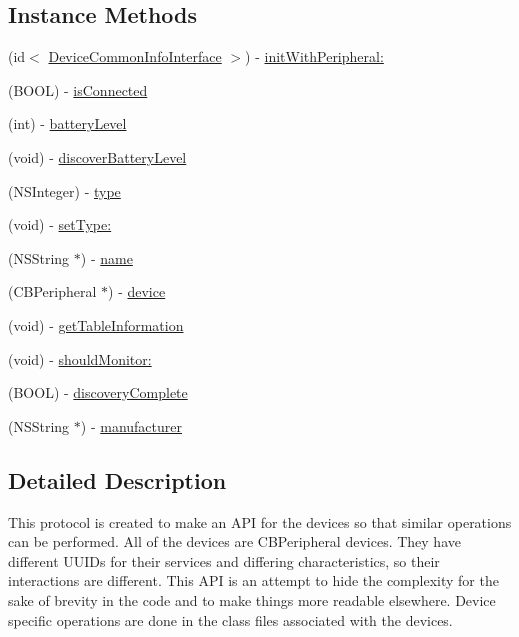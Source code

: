 \subsection*{Instance Methods}
\begin{DoxyCompactItemize}
\item 
(id$<$ \hyperlink{protocol_device_common_info_interface-p}{Device\-Common\-Info\-Interface} $>$) -\/ \hyperlink{protocol_device_common_info_interface-p_ac0680a5ceb7f913c49598eeda2dad07c}{init\-With\-Peripheral\-:}
\item 
(B\-O\-O\-L) -\/ \hyperlink{protocol_device_common_info_interface-p_a5a149dfb93c5c7a364460d8df26537b2}{is\-Connected}
\item 
(int) -\/ \hyperlink{protocol_device_common_info_interface-p_a54b8e239d2d0470be0d906b11b7f3850}{battery\-Level}
\item 
(void) -\/ \hyperlink{protocol_device_common_info_interface-p_a3e95f2da7a5916c8bb6d9b6b76fac3e7}{discover\-Battery\-Level}
\item 
(N\-S\-Integer) -\/ \hyperlink{protocol_device_common_info_interface-p_a2817a747a1ab2cf6f199b1cebe86bd83}{type}
\item 
(void) -\/ \hyperlink{protocol_device_common_info_interface-p_a1fa243ee7ba284b691c365bae4f9b463}{set\-Type\-:}
\item 
(N\-S\-String $\ast$) -\/ \hyperlink{protocol_device_common_info_interface-p_a4ae9cbc86f48df7167b691e91984f266}{name}
\item 
(C\-B\-Peripheral $\ast$) -\/ \hyperlink{protocol_device_common_info_interface-p_a60acee2f42fa42a04ba3585e08d75f8e}{device}
\item 
(void) -\/ \hyperlink{protocol_device_common_info_interface-p_a64200062c5687034c8e2ef6dd83bba0f}{get\-Table\-Information}
\item 
(void) -\/ \hyperlink{protocol_device_common_info_interface-p_a9d3d278049f74d785a57ed2aecf22e22}{should\-Monitor\-:}
\item 
(B\-O\-O\-L) -\/ \hyperlink{protocol_device_common_info_interface-p_a83c3e03ff34cc8b954743a76d77facea}{discovery\-Complete}
\item 
(N\-S\-String $\ast$) -\/ \hyperlink{protocol_device_common_info_interface-p_a4fa63c9f7fe49ddaa32bd40159bc7a8c}{manufacturer}
\end{DoxyCompactItemize}


\subsection{Detailed Description}
This protocol is created to make an A\-P\-I for the devices so that similar operations can be performed. All of the devices are C\-B\-Peripheral devices. They have different U\-U\-I\-Ds for their services and differing characteristics, so their interactions are different. This A\-P\-I is an attempt to hide the complexity for the sake of brevity in the code and to make things more readable elsewhere. Device specific operations are done in the class files associated with the devices. 

